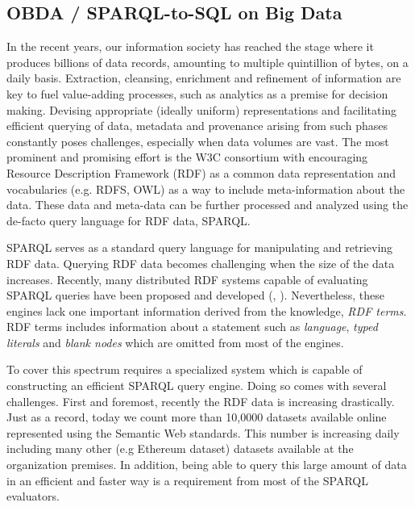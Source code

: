 \subsection{OBDA / SPARQL-to-SQL on Big Data}
In the recent years, our information society has reached the stage where it produces billions of data records, amounting to multiple quintillion of bytes, on a daily basis.
Extraction, cleansing, enrichment and refinement of information are key to fuel value-adding processes, such as analytics as a premise for decision making.
Devising appropriate (ideally uniform) representations and facilitating efficient querying of data, metadata and provenance arising from such phases constantly poses challenges, especially when data volumes are vast. %
The most prominent and promising effort is the W3C consortium with encouraging Resource Description Framework (RDF) as a common data representation and vocabularies (e.g. RDFS, OWL) as a way to include meta-information about the data.
These data and meta-data can be further processed and analyzed using the de-facto query language for RDF data, SPARQL.

SPARQL serves as a standard query language for manipulating and retrieving RDF data.
Querying RDF data becomes challenging when the size of the data increases.
Recently, many distributed RDF systems capable of evaluating SPARQL queries have been proposed and developed (\cite{Schatzle:2016:SRQ:2977797.2977806}, \cite{sparqlgx-iswc-2016}).
Nevertheless, these engines lack one important information derived from the knowledge, \emph{RDF terms}.
RDF terms includes information about a statement such as \emph{language}, \emph{typed literals} and \emph{blank nodes} which are omitted from most of the engines.

To cover this spectrum requires a specialized system which is capable of constructing an efficient SPARQL query engine.
Doing so comes with several challenges.
First and foremost, recently the RDF data is increasing drastically.
Just as a record, today we count more than 10,0000 datasets available online represented using the Semantic Web standards.
This number is increasing daily including many other (e.g Ethereum dataset) datasets available at the organization premises.
In addition, being able to query this large amount of data in an efficient and faster way is a requirement from most of the SPARQL evaluators.

